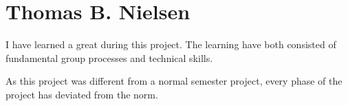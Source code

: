 \section{Thomas B. Nielsen}
I have learned a great during this project. The learning have both consisted of fundamental group processes and technical skills. 

As this project was different from a normal semester project, every phase of the project has deviated from the norm. 